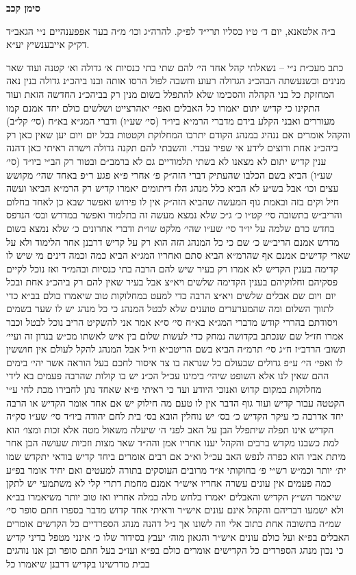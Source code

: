 \documentclass[12pt, openany]{book}
\newcommand{\chapname}{}
\newcommand{\newchap}[1]{
	\addcontentsline{toc}{chapter}{#1}
	\renewcommand{\chapname}{#1}
		\begin{center}
			\textbf{%
\fontsize{16pt}{16pt}\selectfont
				#1}
		\end{center}
}
\begin{document}
\newchap{סימן קכב}
\begin{multicols}{2}
ב״ה אלטאנא, יום ד׳ ט״ו כסליו תרי״ד לפ״ק. להרה״ג וכו׳ מ״ה בער אפפענהיים נ״י הגאב״ד דק״ק אייבענשיץ יע״א.\\\vspace{0pt}

כתב מעכ״ת נ״י – נשאלתי קהל אחד הי׳ להם שתי בתי כנסיות א׳ גדולה וא׳ קטנה ועוד שאר מנינים וכשנעשתה הבהכ״נ הגדולה רעוע וחשבה לפול הרסו אותה ובנו ביהכ״נ גדולה בנין נאה המחזקת כל בני הקהלה והסכימו שלא להתפלל בשום מנין רק בביהכ״נ החדשה הזאת ועוד התקינו כי קדיש יתום יאמרו כל האבלים ואפי׳ יאהרצייט ושלשים כולם יחד אמנם קמו מעוררים ואבני הקלע בידם מדברי הרמ״א ביו״ד (סי׳ שע״ו) ודברי המג״א בא״ח (סי׳ קל״ב) והקהל אומרים אם ננהיג במנהג הקודם יתרבו המחלוקת וקטטות בכל יום ויום יען שאין כאן רק ביהכ״נ אחת ורוצים לידע אי שפיר עבדי. והשבתי להם תקנה גדולה וישרה ראיתי כאן דהנה ענין קדיש יתום לא מצאנו לא בשתי תלמודיים גם לא ברמב״ם ובטור רק הב״י ביו״ד (סי׳ שע״ו) הביא בשם הכלבו שהעתיק דברי הזה״ק פ׳ אחרי פ״א פגע ר״פ באחד שהי׳ מקושש עצים וכו׳ אבל בש״ע לא הביא כלל מנהג הלז דיתומים יאמרו קדיש רק הרמ״א הביאו ועשה חיל וקים בזה ובאמת גוף המעשה שהביא הזה״ק אין לו פירוש ואפשר שבא כן לאחד בחלום והריב״ש בתשובה סי׳ קט״ו כ׳ ג״כ שלא נמצא מעשה זה בתלמוד ואפשר במדרש ובס׳ הנדפס בחדש כרם שלמה על יו״ד סי׳ שע״ו שהי׳ מלקט שו״ת ודברי אחרונים כ׳ שלא נמצא בשום מדרש אמנם הריב״ש כ׳ שם כי כל המנהג הזה הוא רק על קדיש דרבנן אחר הלימוד ולא על שארי קדישים אמנם אף שהרמ״א הביא סתם ואחריו המג״א הביא כמה וכמה דינים מי שיש לו קדימה בענין הקדיש לא אמרו רק בעיר שיש להם הרבה בתי כנסיות ובהמ״ד ואז נוכל לקיים פסקיהם וחלוקיהם בענין הקדימה שלשים ויא״צ אבל בעיר שאין להם רק ביהכ״נ אחת ובכל יום ויום שם אבלים שלשים ויא״צ הרבה כדי למעט במחלוקות טוב שיאמרו כולם בב״א כדי לתווך השלום ומה שהמערערים טוענים שלא לבטל המנהג כי כל מנהג יש לו שער בשמים ויסודתם בהררי קודש מדברי המג״א בא״ח סי׳ ס״א אמר אני להשקיט הריב נוכל לבטל וכבר אמרו חז״ל שם שנכתב בקדושה נמחק כדי לעשות שלום בין איש לאשתו מכ״ש בנדון זה ועיי׳ תשוב׳ הרדב״ז ח״ג סי׳ תרמ״ה הביא בשם הריטב״א וז״ל אבל המנהג להקל לעולם אין חוששין לו ואפי׳ הי׳ ע״פ גדולים שבעולם כל שנראה בו צד איסור לחכם בעל הוראה אשר יהי׳ בימים ההם שאין לנו אלא השופט שיהי׳ בימינו עכ״ל הכ״נ יש בו קולות שהרבה פעמים בא לידי מחלוקות במקום קדוש ואנוכי היודע ועד כי ראיתי פ״א שאחד נתן לחבירו מכת לחי ע״י הקטטה עבור קדיש ועוד גוף הדבר אין לו טעם מה חילוק יש אם אחד אומר הקדיש או הרבה יחד אדרבה כי עיקר הקדיש כ׳ בס׳ יש נוחלין הובא בס׳ בית לחם יהודה ביו״ד סי׳ שע״ו סק״ה הקדיש אינו תפלה שיתפלל הבן על האב לפני ה׳ שיעלה משאול מטה אלא זכות ומצו׳ הוא למת כשבנו מקדש ברבים והקהל יענו אחריו אמן והה״ד שאר מצות וזכיות שעושה הבן אחר מיתת אביו הוא כפרה לנפש האב עכ״ל וא״כ אם רבים אומרים ביחד קדיש בודאי יתקדש שמו ית׳ יותר וכמ״ש רש״י פ׳ בחוקותי א״ד מרובים העוסקים בתורה למעטים ואם יחיד אומר בפ״ע כמה פעמים אין עונים עשרה אחריו איש״ר אמנם מחמת דתרי קלי לא משתמעי יש לתקן שיאמר הש״ץ הקדיש והאבלים יאמרו בלחש מלה במלה אחריו ואז טוב יותר משיאמרו בב״א ולא ישמעו דבריהם והקהל אינם עונים איש״ר וראיתי אחד קדוש מדבר בספרו חתם סופר סי׳ שמ״ה בתשובה אחת כתוב אלי וזה לשונו אך נ״ל דהנה מנהג הספרדיים כל הקדשים אומרים האבלים בפ״א ועל כולם עונים איש״ר והגאון מוה׳ יעבץ בסידור שלו כ׳ אינני מטפל בדיני קדיש כי נכון מנהג הספרדים כל הקדישים אומרים כולם בפ״א ועז״כ בעל חתם סופר וכן אנו נוהגים בבית מדרשינו בקדיש דרבנן שיאמרו כל 
\end{multicols}
\end{document}
